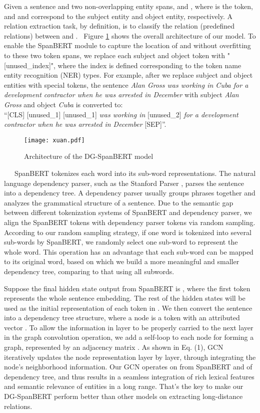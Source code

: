 \documentclass{article}
\begin{document}
Given a sentence  and two non-overlapping entity spans,  and , where  is the  token, and  and  correspond to the subject entity and object entity, respectively. A relation extraction task, by definition, is to classify the relation  (predefined relations) between  and . 
\
Figure \ref{fig:figure1} shows the overall architecture of our model. To enable the SpanBERT module to capture the location of  and  without overfitting to  these two token spans, we replace each subject and object token with "[unused\_index]", where the index is defined corresponding to the token name entity recognition (NER) types. For example, after we replace subject and object entities with special tokens, the sentence \emph{Alan Gross was working in Cuba for a development contractor when he was arrested in December} with subject \emph{Alan Gross} and object \emph{Cuba} is converted to:\\
``[CLS] [unused\_1] [unused\_1] \emph{was working in} [unused\_2] \emph{for a development contractor when he was arrested in December} [SEP]''.
\
\
\begin{figure}[t]
\centering
    \texttt{[image: xuan.pdf]}
\caption{Architecture of the DG-SpanBERT model}
\label{fig:figure1}
\end{figure}
\
\
\
SpanBERT tokenizes each word into its sub-word representations. The natural language dependency parser, such as the Stanford Parser \cite{socher2013parsing}, parses the sentence into a dependency tree. A dependency parser usually groups phrases together and analyzes the grammatical structure of a sentence. Due to the semantic gap between different tokenization systems of SpanBERT and dependency parser, we align the SpanBERT tokens with dependency parser tokens via random sampling. According to our random sampling strategy, if one word is tokenized into several sub-words by SpanBERT, we  randomly select one sub-word to represent the whole word. This operation has an advantage that each sub-word can be mapped to its original word, based on which we build a more meaningful and smaller dependency tree, comparing to that using all subwords.  

Suppose the final hidden state output from SpanBERT is , where the first token  represents the whole sentence embedding. The rest of the hidden states  will be used as the initial representation of  each token in . We then convert the sentence into a dependency tree structure, where a node is a token with an attributed vector . To allow the information in layer  to be properly carried to the next layer  in the graph convolution operation, we add a self-loop to each node for forming a graph, represented by  an adjacency matrix . As shown in Eq. (1), GCN iteratively updates the node representation  layer by layer, through integrating the node's neighborhood information. Our GCN operates on   from SpanBERT and  of dependency tree, and thus results in a seamless integration of rich lexical features and semantic relevance of entities in a long range. That's the key to make our DG-SpanBERT perform better than other models on extracting long-distance relations.
\end{document}
